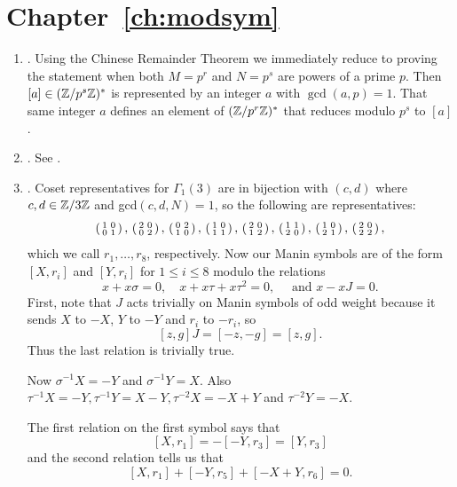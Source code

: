 \section{Chapter~\ref{ch:modsym}}
\begin{enumerate}
\item {}.  
Using the Chinese Remainder Theorem we immediately reduce
to proving the statement when both $M=p^r$ and $N=p^s$ are powers
of a prime $p$. Then $[a]\in(\mathbb{Z}/p^s\mathbb{Z})^*$ is represented by an
integer $a$ with $\gcd(a,p)=1$.  That same integer $a$
defines an element of $(\mathbb{Z}/p^r\mathbb{Z})^*$ that reduces modulo
$p^s$ to $[a]$.



\item {}. See \cite[Lemma 1.38]{shimura:intro}.


\item {}.
Coset representatives for $\Gamma_1(3)$ are in bijection with $(c,d)$ where 
$c,d \in \mathbb{Z}/3\mathbb{Z}$ and gcd$(c,d,N)=1$, so the following are representatives:
$$ 
\left( \begin{smallmatrix}1 &0\\0&1\end{smallmatrix}\right),\,
\left( \begin{smallmatrix}2 &0\\0&2\end{smallmatrix}\right), \,
\left( \begin{smallmatrix}0 &2\\1&0\end{smallmatrix}\right),\,
\left( \begin{smallmatrix}1 &0\\1&1\end{smallmatrix}\right),\,
\left( \begin{smallmatrix}2 &0\\1&2\end{smallmatrix}\right),\,
\left( \begin{smallmatrix}1 &1\\2&0\end{smallmatrix}\right),\,
\left( \begin{smallmatrix}1 &0\\2&1\end{smallmatrix}\right),\,
\left( \begin{smallmatrix}2 &0\\2&2\end{smallmatrix}\right),
$$
which we call $r_1, \ldots, r_8$, respectively.
Now our Manin symbols are of the form $[X,r_i]$ 
and $[Y, r_i]$ for $1 \le i \le 8$ 
modulo the relations 
$$x+x\sigma = 0, \quad x+x\tau+x\tau^2 = 0, \quad\text{ and } x-xJ = 0.$$
First, note that $J$ acts trivially on Manin symbols of odd weight because 
it sends $X$ to $-X$, $Y$ to $-Y$ and $r_i$ to $-r_i$, so $$[z,g]J = [-z,-g] = [z,g].$$ Thus the last relation is trivially true. 

Now $\sigma^{-1}X = -Y$ and $\sigma^{-1}Y = X$. 
Also $\tau^{-1}X = -Y, \tau^{-1}Y = X-Y, \tau^{-2}X = -X+Y$ 
and $\tau^{-2}Y = -X$. 

The first relation on the first symbol says that
$$[X, r_1] = -[-Y, r_3] = [Y, r_3]$$
and the second relation tells us that
$$[X, r_1] + [-Y, r_5] + [-X+Y, r_6] = 0.$$




\end{enumerate}
